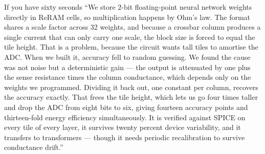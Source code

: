 \documentclass[11pt,a4paper]{report}
\begin{document}
\begin{saybox}{If you have sixty seconds}
``We store 2-bit floating-point neural network weights directly in ReRAM
cells, so multiplication happens by Ohm's law. The format shares a scale factor
across 32 weights, and because a crossbar column produces a single current
that can only carry one scale, the block size is forced to equal the tile
height. That is a problem, because the circuit wants tall tiles to amortise the
ADC. When we built it, accuracy fell to random guessing. We found the cause
was not noise but a deterministic gain --- the output is attenuated by one
plus the sense resistance times the column conductance, which depends only on
the weights we programmed. Dividing it back out, one constant per column,
recovers the accuracy exactly. That frees the tile height, which lets us go
four times taller and drop the ADC from eight bits to six, giving fourteen
accuracy points and thirteen-fold energy efficiency simultaneously. It is
verified against SPICE on every tile of every layer, it survives twenty percent
device variability, and it transfers to transformers --- though it needs
periodic recalibration to survive conductance drift.''
\end{saybox}
\end{document}
